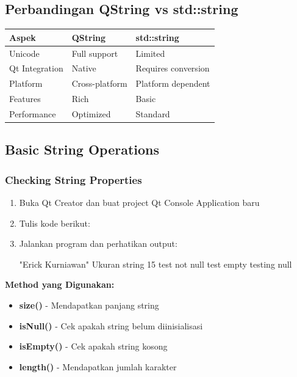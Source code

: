 \subsection{Perbandingan QString vs std::string}

\begin{center}
\begin{tabular}{|l|l|l|}
\hline
\textbf{Aspek} & \textbf{QString} & \textbf{std::string} \\
\hline
Unicode & Full support & Limited \\
\hline
Qt Integration & Native & Requires conversion \\
\hline
Platform & Cross-platform & Platform dependent \\
\hline
Features & Rich & Basic \\
\hline
Performance & Optimized & Standard \\
\hline
\end{tabular}
\end{center}

\subsection{Basic String Operations}

\subsubsection{Checking String Properties}

\begin{enumerate}
\item Buka Qt Creator dan buat project Qt Console Application baru
\item Tulis kode berikut:



\item Jalankan program dan perhatikan output:

\begin{lcverbatim}
"Erick Kurniawan"
Ukuran string 15
test not null
test empty
testing null
\end{lcverbatim}
\end{enumerate}

\textbf{Method yang Digunakan:}
\begin{itemize}
\item \textbf{size()} - Mendapatkan panjang string
\item \textbf{isNull()} - Cek apakah string belum diinisialisasi
\item \textbf{isEmpty()} - Cek apakah string kosong
\item \textbf{length()} - Mendapatkan jumlah karakter
\end{itemize}

